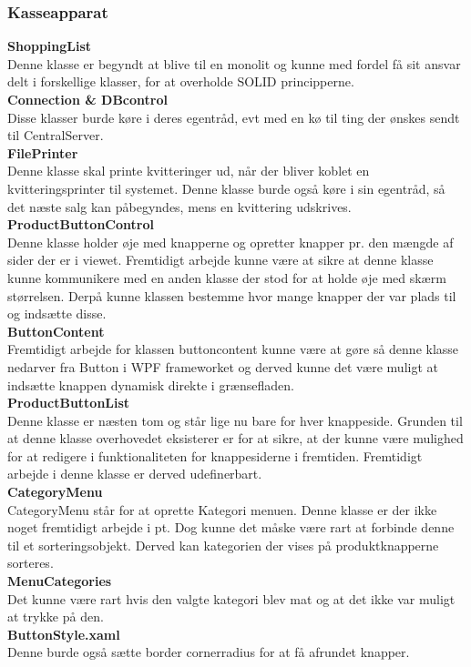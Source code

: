 \subsubsection{Kasseapparat}

\textbf{ShoppingList} \\
Denne klasse er begyndt at blive til en monolit og kunne med fordel få sit ansvar delt i forskellige klasser, for at overholde SOLID principperne.\\ 

\textbf{Connection \& DBcontrol} \\
Disse klasser burde køre i deres egentråd, evt med en kø til ting der ønskes sendt til CentralServer. \\

\textbf{FilePrinter} \\
Denne klasse skal printe kvitteringer ud, når der bliver koblet en kvitteringsprinter til systemet. Denne klasse burde også køre i sin egentråd, så det næste salg kan påbegyndes, mens en kvittering udskrives. \\

\textbf{ProductButtonControl} \\
Denne klasse holder øje med knapperne og opretter knapper pr. den mængde af sider der er i viewet. Fremtidigt arbejde kunne være at sikre at denne klasse kunne kommunikere med en anden klasse der stod for at holde øje med skærm størrelsen. Derpå kunne klassen bestemme hvor mange knapper der var plads til og indsætte disse. \\

\textbf{ButtonContent} \\
Fremtidigt arbejde for klassen buttoncontent kunne være at gøre så denne klasse nedarver fra Button i WPF frameworket og derved kunne det være muligt at indsætte knappen dynamisk direkte i grænsefladen. \\

\textbf{ProductButtonList}\\
Denne klasse er næsten tom og står lige nu bare for hver knappeside. Grunden til at denne klasse overhovedet eksisterer er for at sikre, at der kunne være mulighed for at redigere i funktionaliteten for knappesiderne i fremtiden. Fremtidigt arbejde i denne klasse er derved udefinerbart.\\

\textbf{CategoryMenu}\\
CategoryMenu står for at oprette Kategori menuen. Denne klasse er der ikke noget fremtidigt arbejde i pt. Dog kunne det måske være rart at forbinde denne til et sorteringsobjekt. Derved kan kategorien der vises på produktknapperne sorteres.\\

\textbf{MenuCategories}\\
Det kunne være rart hvis den valgte kategori blev mat og at det ikke var muligt at trykke på den. \\

\textbf{ButtonStyle.xaml} \\
Denne burde også sætte border cornerradius for at få afrundet knapper.\\
